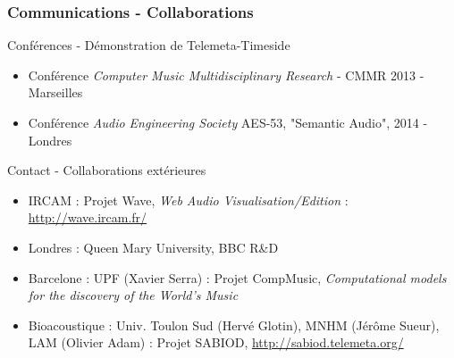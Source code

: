 \documentclass[10pt, final, hyperref, table]{beamer}
\begin{document}
\begin{frame}
\frametitle{Communications - Collaborations}
\begin{block}{Conférences - Démonstration de Telemeta-Timeside}
  \begin{itemize}
  \item Conférence \emph{Computer Music Multidisciplinary Research} - CMMR 2013 - Marseilles
  \item Conférence \emph{Audio Engineering Society} AES-53, "Semantic Audio", 2014 - Londres 
  \end{itemize}
\end{block}
\begin{block}{Contact - Collaborations extérieures}
  \begin{itemize}
  \item IRCAM : Projet Wave, \emph{Web Audio Visualisation/Edition} : \url{http://wave.ircam.fr/}
  \item Londres : Queen Mary University, BBC R\&D
  \item Barcelone : UPF (Xavier Serra) :  Projet CompMusic, \emph{Computational models for the discovery of the World’s Music}
  \item Bioacoustique : Univ. Toulon Sud (Hervé Glotin), MNHM (Jérôme Sueur), LAM (Olivier Adam) :  Projet SABIOD, \url{http://sabiod.telemeta.org/}
  \end{itemize}
\end{block}
\end{frame}
\end{document}
